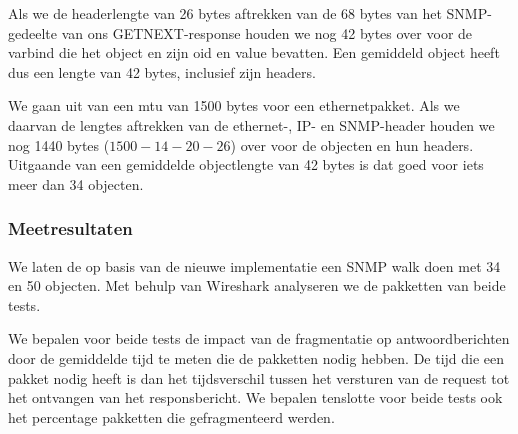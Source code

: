 Als we de headerlengte van 26 bytes aftrekken van de 68 bytes van het SNMP-gedeelte van ons GETNEXT-response houden we nog 42 bytes over voor de varbind
die het object en zijn \gls{oid} en value bevatten.
Een gemiddeld object heeft dus een lengte van 42 bytes, inclusief zijn headers.

We gaan uit van een \gls{mtu} van 1500 bytes voor een ethernetpakket.
Als we daarvan de lengtes aftrekken van de ethernet-, IP- en SNMP-header houden we nog 1440 bytes ($1500 - 14 - 20 - 26$) over voor de objecten en hun headers.
Uitgaande van een gemiddelde objectlengte van 42 bytes is dat goed voor iets meer dan 34 objecten.

\subsubsection{Meetresultaten}

We laten de \nwmretriever{} op basis van de nieuwe implementatie een SNMP walk doen met 34 en 50 objecten.
Met behulp van Wireshark analyseren we de pakketten van beide tests.

We bepalen voor beide tests de impact van de fragmentatie op antwoordberichten door de gemiddelde tijd te meten die de pakketten nodig hebben.
De tijd die een pakket nodig heeft is dan het tijdsverschil tussen het versturen van de request tot het ontvangen van het responsbericht.
We bepalen tenslotte voor beide tests ook het percentage pakketten die gefragmenteerd werden.

